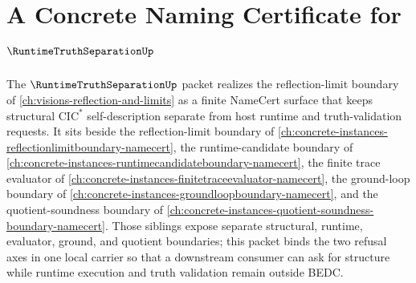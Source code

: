 \chapter{A Concrete Naming Certificate for $\RuntimeTruthSeparationUp$}
\label{ch:concrete-instances-runtime-truth-separation-namecert}

The $\RuntimeTruthSeparationUp$ packet realizes the reflection-limit boundary of \autoref{ch:visions-reflection-and-limits} as a finite NameCert surface that keeps structural $\mathrm{CIC}^{*}$ self-description separate from host runtime and truth-validation requests. It sits beside the reflection-limit boundary of \autoref{ch:concrete-instances-reflectionlimitboundary-namecert}, the runtime-candidate boundary of \autoref{ch:concrete-instances-runtimecandidateboundary-namecert}, the finite trace evaluator of \autoref{ch:concrete-instances-finitetraceevaluator-namecert}, the ground-loop boundary of \autoref{ch:concrete-instances-groundloopboundary-namecert}, and the quotient-soundness boundary of \autoref{ch:concrete-instances-quotient-soundness-boundary-namecert}. Those siblings expose separate structural, runtime, evaluator, ground, and quotient boundaries; this packet binds the two refusal axes in one local carrier so that a downstream consumer can ask for structure while runtime execution and truth validation remain outside BEDC.

